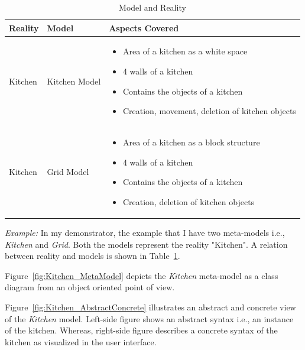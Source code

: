 \begin{table}
	\centering	
	\begin{tabular}{|p{3cm}|p{3cm}|p{9cm}|}
		\hline
		\rowcolor[gray]{.8}	
		\textbf{Reality} & \textbf{Model} & \textbf{Aspects Covered} \\
		\hline
		Kitchen & Kitchen Model & 
		\begin{itemize}
			\item Area of a kitchen as a white space
			\item 4 walls of a kitchen
			\item Contains the objects of a kitchen
			\item Creation, movement, deletion of kitchen objects
		\end{itemize}\\
		\hline
		Kitchen & Grid Model & 
		\begin{itemize}
			\item Area of a kitchen as a block structure
			\item 4 walls of a kitchen
			\item Contains the objects of a kitchen
			\item Creation, deletion of kitchen objects
		\end{itemize}\\
		\hline					
		
	\end{tabular}
	\caption{Model and Reality}
	\label{tab:Model_Reality}
\end{table}

\textit{Example:} In my demonstrator, the example that I have two meta-models i.e., \textit{Kitchen} and \textit{Grid}. Both the models represent the reality "Kitchen". A relation between reality and models is shown in Table~\ref{tab:Model_Reality}. 

Figure~\ref{fig:Kitchen_MetaModel} depicts the \textit{Kitchen} meta-model as a class diagram from an object oriented point of view.

Figure~\ref{fig:Kitchen_AbstractConcrete} illustrates an abstract and concrete view of the \textit{Kitchen} model. Left-side figure shows an abstract syntax i.e., an instance of the kitchen. Whereas, right-side figure describes a concrete syntax of the kitchen as visualized in the user interface.\\

